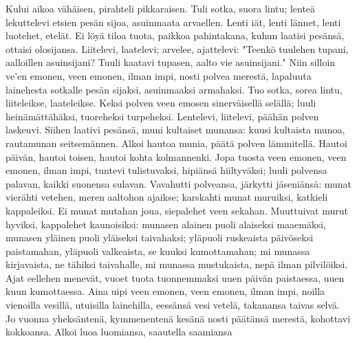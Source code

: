   \endverse
  \beginverse
    Kului aikoa vähäisen,
    pirahteli pikkaraisen.
    Tuli sotka, suora lintu;
    lenteä lekuttelevi
  \endverse
  \beginverse
    etsien pesän sijoa,
    asuinmaata arvaellen.
    Lenti iät, lenti lännet,
    lenti luotehet, etelät.
    Ei löyä tiloa tuota,
    paikkoa pahintakana,
    kuhun laatisi pesänsä,
    ottaisi olosijansa.
  \endverse
  \beginverse
    Liitelevi, laatelevi;
    arvelee, ajattelevi:
  \endverse
  \beginverse
    "Teenkö tuulehen tupani,
    aalloillen asuinsijani?
    Tuuli kaatavi tupasen,
    aalto vie asuinsijani."
    Niin silloin ve'en emonen,
    veen emonen, ilman impi,
    nosti polvea merestä,
    lapaluuta lainehesta
    sotkalle pesän sijaksi,
    asuinmaaksi armahaksi.
  \endverse
  \beginverse
    Tuo sotka, sorea lintu,
    liiteleikse, laateleikse.
    Keksi polven veen emosen
    sinerväisellä selällä;
    luuli heinämättähäksi,
    tuoreheksi turpeheksi.
    Lentelevi, liitelevi,
    päähän polven laskeuvi.
    Siihen laativi pesänsä,
    muni kultaiset munansa:
  \endverse
  \beginverse
    kuusi kultaista munoa,
    rautamunan seitsemännen.
  \endverse
  \beginverse
    Alkoi hautoa munia,
    päätä polven lämmitellä.
    Hautoi päivän, hautoi toisen,
    hautoi kohta kolmannenki.
    Jopa tuosta veen emonen,
    veen emonen, ilman impi,
    tuntevi tulistuvaksi,
    hipiänsä hiiltyväksi;
  \endverse
  \beginverse
    luuli polvensa palavan,
    kaikki suonensa sulavan.
    Vavahutti polveansa,
    järkytti jäseniänsä:
    munat vierähti vetehen,
    meren aaltohon ajaikse;
    karskahti munat muruiksi,
    katkieli kappaleiksi.
  \endverse
  \beginverse
    Ei munat mutahan joua,
    siepalehet veen sekahan.
  \endverse
  \beginverse
    Muuttuivat murut hyviksi,
    kappalehet kaunoisiksi:
    munasen alainen puoli
    alaiseksi maaemäksi,
    munasen yläinen puoli
    yläiseksi taivahaksi;
    yläpuoli ruskeaista
    päivöseksi paistamahan,
    yläpuoli valkeaista,
    se kuuksi kumottamahan;
    mi munassa kirjavaista,
    ne tähiksi taivahalle,
    mi munassa mustukaista,
    nepä ilman pilvilöiksi.
  \endverse
  \beginverse
    Ajat eellehen menevät,
    vuoet tuota tuonnemmaksi
    uuen päivän paistaessa,
    uuen kuun kumottaessa.
    Aina uipi veen emonen,
    veen emonen, ilman impi,
  \endverse
  \beginverse
    noilla vienoilla vesillä,
    utuisilla lainehilla,
    eessänsä vesi vetelä,
    takanansa taivas selvä.
    Jo vuonna yheksäntenä,
    kymmenentenä kesänä
    nosti päätänsä merestä,
    kohottavi kokkoansa.
    Alkoi luoa luomiansa,
    saautella saamiansa
  \endverse
